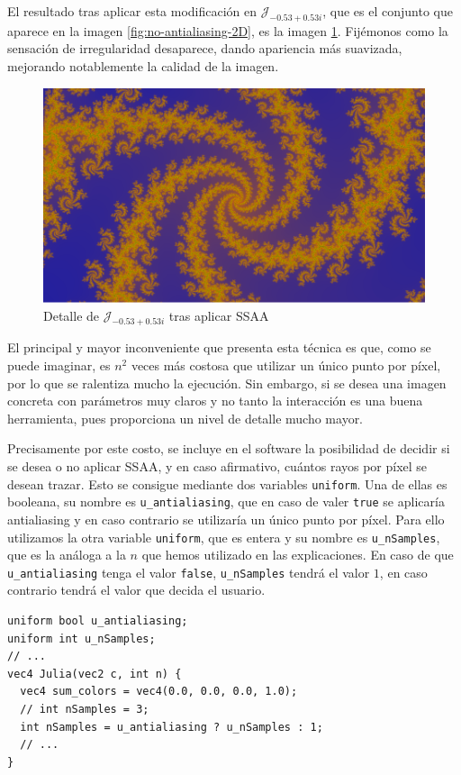 El resultado tras aplicar esta modificación en $\mathcal{J}_{-0.53 + 0.53i}$, que es el conjunto que aparece en la imagen \ref{fig:no-antialiasing-2D}, es la imagen \ref{fig:antialiasing-2D}. Fijémonos como la sensación de irregularidad desaparece, dando apariencia más suavizada, mejorando notablemente la calidad de la imagen.

\begin{figure} [ht]
  \centering
  \includegraphics[width=130mm]{img/C7/antialiasing.png}
  \caption{Detalle de $\mathcal{J}_{-0.53 + 0.53i}$ tras aplicar SSAA}
  \label{fig:antialiasing-2D}
\end{figure}

El principal y mayor inconveniente que presenta esta técnica es que, como se puede imaginar, es $n^2$ veces más costosa que utilizar un único punto por píxel, por lo que se ralentiza mucho la ejecución. Sin embargo, si se desea una imagen concreta con parámetros muy claros y no tanto la interacción es una buena herramienta, pues proporciona un nivel de detalle mucho mayor.

Precisamente por este costo, se incluye en el software la posibilidad de decidir si se desea o no aplicar SSAA, y en caso afirmativo, cuántos rayos por píxel se desean trazar. Esto se consigue mediante dos variables \verb|uniform|. Una de ellas es booleana, su nombre es \verb|u_antialiasing|, que en caso de valer \verb|true| se aplicaría antialiasing y en caso contrario se utilizaría un único punto por píxel. Para ello utilizamos la otra variable \verb|uniform|, que es entera y su nombre es \verb|u_nSamples|, que es la análoga a la $n$ que hemos utilizado en las explicaciones. En caso de que \verb|u_antialiasing| tenga el valor \verb|false|, \verb|u_nSamples| tendrá el valor $1$, en caso contrario tendrá el valor que decida el usuario.  

\begin{lstlisting}
uniform bool u_antialiasing;
uniform int u_nSamples;
// ...
vec4 Julia(vec2 c, int n) {
  vec4 sum_colors = vec4(0.0, 0.0, 0.0, 1.0);
  // int nSamples = 3;
  int nSamples = u_antialiasing ? u_nSamples : 1;
  // ... 
}
\end{lstlisting}

